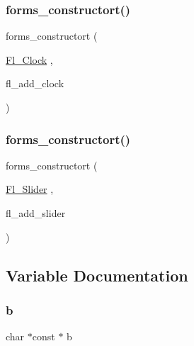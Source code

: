 \mbox{\label{forms_8_h_a13434f80af3723dcccebcbdfea3f3dc0}} 
\subsubsection{\texorpdfstring{forms\+\_\+constructort()}{forms\_constructort()}\hspace{0.1cm}{\footnotesize\ttfamily [1/2]}}
{\footnotesize\ttfamily forms\+\_\+constructort (\begin{DoxyParamCaption}\item[{\hyperlink{class_fl___clock}{Fl\+\_\+\+Clock}}]{,  }\item[{fl\+\_\+add\+\_\+clock}]{ }\end{DoxyParamCaption})}

\mbox{\label{forms_8_h_a8eac24d863b57042573cb40c5f527857}} 
\subsubsection{\texorpdfstring{forms\+\_\+constructort()}{forms\_constructort()}\hspace{0.1cm}{\footnotesize\ttfamily [2/2]}}
{\footnotesize\ttfamily forms\+\_\+constructort (\begin{DoxyParamCaption}\item[{\hyperlink{class_fl___slider}{Fl\+\_\+\+Slider}}]{,  }\item[{fl\+\_\+add\+\_\+slider}]{ }\end{DoxyParamCaption})}



\subsection{Variable Documentation}
\mbox{\label{forms_8_h_a0ba06a290a384fa06b1b90745827dae2}} 
\subsubsection{\texorpdfstring{b}{b}}
{\footnotesize\ttfamily char $\ast$const  $\ast$ b}

